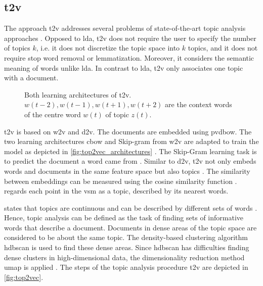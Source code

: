 \subsection{\acl*{t2v}}\label{subsec:top2vec}

The approach \ac{t2v} addresses several problems of state-of-the-art topic analysis approaches \cite{Top2Vec2020}.
Opposed to \ac{lda}, \ac{t2v} does not require the user to specify the number of topics $k$, 
i.e. it does not discretize the topic space into $k$ topics, 
and it does not require stop word removal or lemmatization.
Moreover, it considers the semantic meaning of words unlike \ac{lda}.
In contrast to \ac{lda}, \ac{t2v} only associates one topic with a document.

\begin{figure}%
    \centering
    \qquad
    \caption[Two learning architectures of \ac{t2v}]{Both learning architectures of \ac{t2v}.
    $w(t-2), w(t-1), w(t+1), w(t+2)$ are the context words of the centre word $w(t)$ of topic $z(t)$.
    }%
    \label{fig:top2vec_architectures}%
\end{figure}

\ac{t2v} is based on \ac{w2v} and \ac{d2v}.
The documents are embedded using \ac{pvdbow}.
The two learning architectures \ac{cbow} and Skip-gram from \ac{w2v} are adapted to train the model as depicted in \autoref{fig:top2vec_architectures} \cite{Topic2Vec2015}.
The Skip-Gram learning task is to predict the document a word came from \cite{Top2Vec2020, Topic2Vec2015}.
Similar to \ac{d2v}, \ac{t2v} not only embeds words and documents in the same feature space but also topics \cite{Top2Vec2020, Topic2Vec2015}.
The similarity between embeddings can be measured using the cosine similarity function \cite{Topic2Vec2015}.
\citeauthor{Top2Vec2020} regards each point in the \ac{vsm} as a topic, described by its nearest words.

\citeauthor{Top2Vec2020} states that topics are continuous and can be described by different sets of words \cite{Top2Vec2020}.
Hence, topic analysis can be defined as the task of finding sets of informative words that describe a document.
Documents in dense areas of the topic space are considered to be about the same topic.
The density-based clustering algorithm \ac{hdbscan} is used to find these dense areas.
Since \ac{hdbscan} has difficulties finding dense clusters in high-dimensional data, 
the dimensionality reduction method \ac{umap} is applied \cite{Top2Vec2020}.
The steps of the topic analysis procedure \ac{t2v} are depicted in \autoref{fig:top2vec}.

